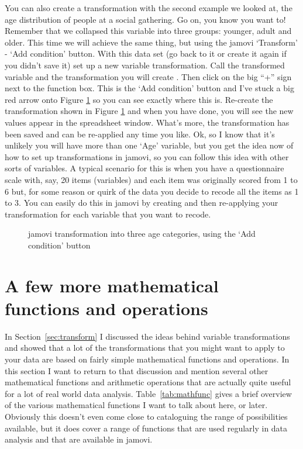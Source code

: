You can also create a transformation with the second example we looked at, the age distribution of people at a social gathering. Go on, you know you want to! Remember that we collapsed this variable into three groups: younger, adult and older. This time we will achieve the same thing, but using the jamovi `Transform' - `Add condition' button. With this data set (go back to it or create it again if you didn't save it) set up a new variable transformation. Call the transformed variable  and the transformation you will create . Then click on the big ``+'' sign next to the function box. This is the `Add condition' button and I've stuck a big red arrow onto Figure \ref{fig:transform3} so you can see exactly where this is. Re-create the transformation shown in Figure \ref{fig:transform3} and when you have done, you will see the new values appear in the spreadsheet window. What's more, the  transformation has been saved and can be re-applied any time you like. Ok, so I know that it's unlikely you will have more than one `Age' variable, but you get the idea now of how to set up transformations in jamovi, so you can follow this idea with other sorts of variables. A typical scenario for this is when you have a questionnaire scale with, say, 20 items (variables) and each item was originally  scored from 1 to 6 but, for some reason or quirk of the data you decide to recode all the items as 1 to 3. You can easily do this in jamovi by creating and then re-applying your transformation for each variable that you want to recode.  

\begin{figure}[p]
\begin{center}
\caption{jamovi transformation into three age categories, using the `Add condition' button}
\label{fig:transform3}
\HR
\end{center}
\end{figure}

\newpage

\section{A few more mathematical functions and operations~\label{sec:mathfunc}}

In Section~\ref{sec:transform} I discussed the ideas behind variable transformations and showed that a lot of the transformations that you might want to apply to your data are based on fairly simple mathematical functions and operations. In this section I want to return to that discussion and mention several other mathematical functions and arithmetic operations that are actually quite useful for a lot of real world data analysis. Table~\ref{tab:mathfunc} gives a brief overview of the various mathematical functions I want to talk about here, or later. Obviously this doesn't even come close to cataloguing the range of possibilities available, but it does cover a range of functions that are used regularly in data analysis and that are available in jamovi.

